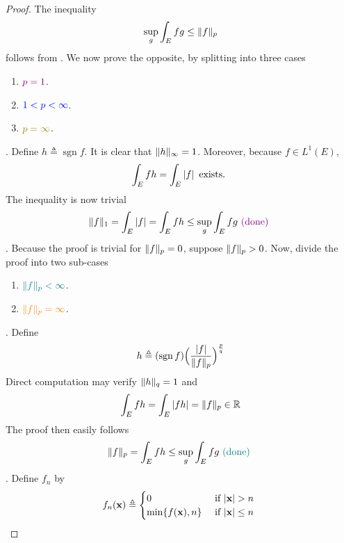 \documentclass{report}
\begin{document}
\begin{proof}
The inequality 
\begin{align*}
\sup_g \int_E fg \leq \| f \|_p
\end{align*}
follows from . We now prove the opposite, by splitting into three cases 
\begin{enumerate}[label=(\alph*)]
  \item $\textcolor{violet}{p=1}$.  
  \item $\textcolor{blue}{1< p < \infty}$. 
  \item $\olive{p=\infty}$. 
\end{enumerate} 
. Define $h \triangleq \operatorname{sgn}f$. It is clear that $\| h \|_{\infty}=1$. Moreover, because $f\in L^1(E)$, 
\begin{align*}
\int_E fh= \int_E \left|f\right|\text{ exists. }
\end{align*}
The inequality is now trivial 
\begin{align*}
\| f \|_1 = \int_E \left|f\right|= \int_E fh\leq \sup_g \int_E fg \textcolor{violet}{\text{ (done) }}
\end{align*}
. Because the proof is trivial for $\| f \|_p=0$, suppose $\| f \|_p >0$. Now, divide the proof into two sub-cases 
\begin{enumerate}[label=(\alph*)]
  \item $\textcolor{teal}{\| f \|_p<\infty}$. 
  \item $\textcolor{orange}{\| f \|_p=\infty}$.  
\end{enumerate}
. Define 
\begin{align}
\label{hsgn}
h\triangleq (\operatorname{sgn}f) \Big( \frac{\left|f\right|}{\| f \|_p} \Big) ^{ \frac{p}{q}}
\end{align}
Direct computation may verify $\| h \|_q=1$ and 
\begin{align*}
  \int_E fh=\int_E \left|fh\right| = \| f \|_p \in\mathbb{R}
\end{align*}
The proof then easily follows  
\begin{align*}
  \| f \|_p =\int_E fh \leq \sup_g \int_E fg \textcolor{teal}{\text{ (done) }}
\end{align*}
. Define $f_n$ by 
\begin{align*}
f_n(\textbf{x})\triangleq \begin{cases}
  0& \text{ if $\abso{\textbf{x}}>n$ }\\
  \min \set{f(\textbf{x}),n}& \text{ if $\abso{\textbf{x}}\leq n$ } 
\end{cases}

\end{align*}
\end{proof}
\end{document}
